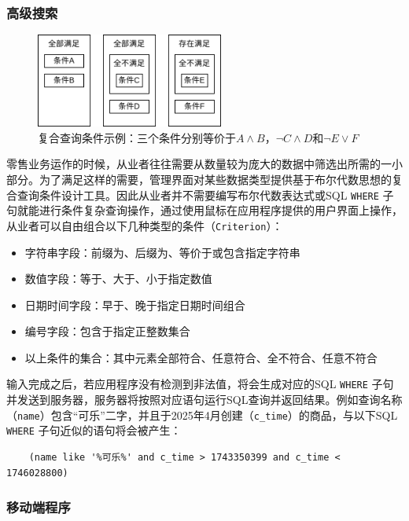 \subsubsection{高级搜索}

\begin{figure}[htbp]
	\centering
	\includegraphics[width=0.55\textwidth]{./imgs/rma-design-adse.png}
	\caption{复合查询条件示例：三个条件分别等价于$ A \land B $，$ \neg C \land D $和$ \neg E \lor F $}
	\label{fig:rma-design-adse}
\end{figure}

零售业务运作的时候，从业者往往需要从数量较为庞大的数据中筛选出所需的一小部分。为了满足这样的需要，管理界面对某些数据类型提供基于布尔代数思想的复合查询条件设计工具。因此从业者并不需要编写布尔代数表达式或SQL \verb|WHERE| 子句就能进行条件复杂查询操作，通过使用鼠标在应用程序提供的用户界面上操作，从业者可以自由组合以下几种类型的条件（\verb|Criterion|）：

\begin{itemize}
	\item 字符串字段：前缀为、后缀为、等价于或包含指定字符串
	\item 数值字段：等于、大于、小于指定数值
	\item 日期时间字段：早于、晚于指定日期时间组合
	\item 编号字段：包含于指定正整数集合
	\item 以上条件的集合：其中元素全部符合、任意符合、全不符合、任意不符合
\end{itemize}

输入完成之后，若应用程序没有检测到非法值，将会生成对应的SQL \verb|WHERE| 子句并发送到服务器，服务器将按照对应语句运行SQL查询并返回结果。例如查询名称（\verb|name|）包含“可乐”二字，并且于2025年4月创建（\verb|c_time|）的商品，与以下SQL \verb|WHERE| 子句近似的语句将会被产生：

\begin{verbatim}
	(name like '%可乐%' and c_time > 1743350399 and c_time < 1746028800)
\end{verbatim}

\subsubsection{移动端程序}

